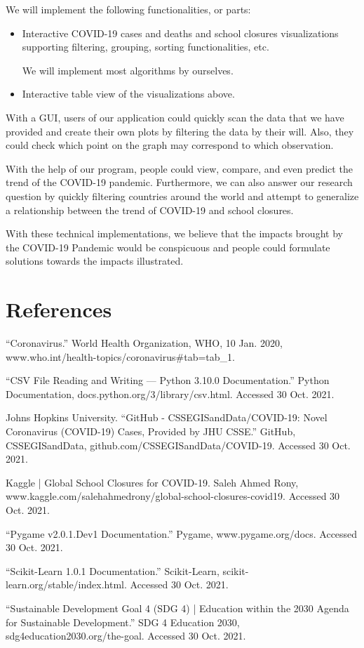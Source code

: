 \documentclass[fontsize=11pt]{article}
\begin{document}
We will implement the following functionalities, or parts:

\begin{itemize}
    \item
        Interactive COVID-19 cases and deaths and school closures visualizations supporting filtering, grouping, sorting functionalities, etc.

        We will implement most algorithms by ourselves.
    \item
        Interactive table view of the visualizations above.
\end{itemize}

With a GUI, users of our application could quickly scan the data that we have provided and create their own plots by filtering the data by their will. Also, they could check which point on the graph may correspond to which observation.

With the help of our program, people could view, compare, and even predict the trend of the COVID-19 pandemic. Furthermore, we can also answer our research question by quickly filtering countries around the world and attempt to generalize a relationship between the trend of COVID-19 and school closures.

With these technical implementations, we believe that the impacts brought by the COVID-19 Pandemic would be conspicuous and people could formulate solutions towards the impacts illustrated.

\newpage

\section*{References}

“Coronavirus.” World Health Organization, WHO, 10 Jan. 2020, www.who.int/health-topics/coronavirus\#tab=tab\_1.

“CSV File Reading and Writing — Python 3.10.0 Documentation.” Python Documentation, docs.python.org/3/library/csv.html. Accessed 30 Oct. 2021.

Johns Hopkins University. “GitHub - CSSEGISandData/COVID-19: Novel Coronavirus (COVID-19) Cases, Provided by JHU CSSE.” GitHub, CSSEGISandData, github.com/CSSEGISandData/COVID-19. Accessed 30 Oct. 2021.

Kaggle | Global School Closures for COVID-19. Saleh Ahmed Rony, www.kaggle.com/salehahmedrony/global-school-closures-covid19. Accessed 30 Oct. 2021.

“Pygame v2.0.1.Dev1 Documentation.” Pygame, www.pygame.org/docs. Accessed 30 Oct. 2021.

“Scikit-Learn 1.0.1 Documentation.” Scikit-Learn, scikit-learn.org/stable/index.html. Accessed 30 Oct. 2021.

“Sustainable Development Goal 4 (SDG 4) | Education within the 2030 Agenda for Sustainable Development.” SDG 4 Education 2030, sdg4education2030.org/the-goal. Accessed 30 Oct. 2021.
\end{document}

